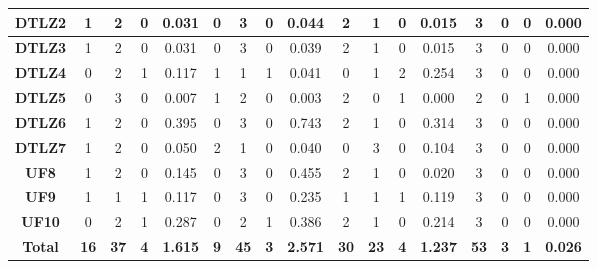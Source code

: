 \begin{table*}[t]
\begin{tabular}{c|c|c|c|c|c|c|c|c|c|c|c|c|c|c|c|c|}
\multicolumn{1}{|c|}{\textbf{DTLZ2}} & 1 & 2 & 0 & 0.031 & 0 & 3 & 0 & 0.044 & 2 & 1 & 0 & 0.015 & 3 & 0 & 0 & 0.000 \\ \hline
\multicolumn{1}{|c|}{\textbf{DTLZ3}} & 1 & 2 & 0 & 0.031 & 0 & 3 & 0 & 0.039 & 2 & 1 & 0 & 0.015 & 3 & 0 & 0 & 0.000 \\ \hline
\multicolumn{1}{|c|}{\textbf{DTLZ4}} & 0 & 2 & 1 & 0.117 & 1 & 1 & 1 & 0.041 & 0 & 1 & 2 & 0.254 & 3 & 0 & 0 & 0.000 \\ \hline
\multicolumn{1}{|c|}{\textbf{DTLZ5}} & 0 & 3 & 0 & 0.007 & 1 & 2 & 0 & 0.003 & 2 & 0 & 1 & 0.000 & 2 & 0 & 1 & 0.000 \\ \hline
\multicolumn{1}{|c|}{\textbf{DTLZ6}} & 1 & 2 & 0 & 0.395 & 0 & 3 & 0 & 0.743 & 2 & 1 & 0 & 0.314 & 3 & 0 & 0 & 0.000 \\ \hline
\multicolumn{1}{|c|}{\textbf{DTLZ7}} & 1 & 2 & 0 & 0.050 & 2 & 1 & 0 & 0.040 & 0 & 3 & 0 & 0.104 & 3 & 0 & 0 & 0.000 \\ \hline
\multicolumn{1}{|c|}{\textbf{UF8}} & 1 & 2 & 0 & 0.145 & 0 & 3 & 0 & 0.455 & 2 & 1 & 0 & 0.020 & 3 & 0 & 0 & 0.000 \\ \hline
\multicolumn{1}{|c|}{\textbf{UF9}} & 1 & 1 & 1 & 0.117 & 0 & 3 & 0 & 0.235 & 1 & 1 & 1 & 0.119 & 3 & 0 & 0 & 0.000 \\ \hline
\multicolumn{1}{|c|}{\textbf{UF10}} & 0 & 2 & 1 & 0.287 & 0 & 2 & 1 & 0.386 & 2 & 1 & 0 & 0.214 & 3 & 0 & 0 & 0.000 \\ \hline
\multicolumn{1}{|c|}{\textbf{Total}} & \textbf{16} & \textbf{37} & \textbf{4} & \textbf{1.615} & \textbf{9} & \textbf{45} & \textbf{3} & \textbf{2.571} & \textbf{30} & \textbf{23} & \textbf{4} & \textbf{1.237} & \textbf{53} & \textbf{3} & \textbf{1} & \textbf{0.026} \\ \hline
\end{tabular}%
\end{table*}

